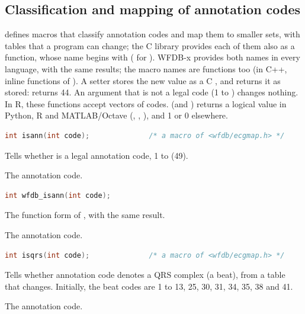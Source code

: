 \subsection{Classification and mapping of annotation codes}
\label{sec:library-ecgmap}

 defines macros that classify annotation codes and map
them to smaller sets, with tables that a program can change; the C library
provides each of them also as a function, whose name begins with
 ( for ). WFDB-x provides both
names in every language, with the same results; the macro names are
functions too (in C++, inline functions of ). A
setter stores the new value as a C , and returns it as stored:
 returns 44. An argument that is not a legal code
(1 to ) changes nothing. In R, these functions accept vectors of
codes.  (and ) returns a logical value in
Python, R and MATLAB/Octave (, , ), and 1 or
0 elsewhere.

\begin{lstlisting}[language=C,style=signature]
int isann(int code);              /* a macro of <wfdb/ecgmap.h> */
\end{lstlisting}
Tells whether  is a legal annotation code, 1 to  (49).
\begin{params}
\item[code] The annotation code.
\end{params}

\begin{lstlisting}[language=C,style=signature]
int wfdb_isann(int code);
\end{lstlisting}
The function form of , with the same result.
\begin{params}
\item[code] The annotation code.
\end{params}

\begin{lstlisting}[language=C,style=signature]
int isqrs(int code);              /* a macro of <wfdb/ecgmap.h> */
\end{lstlisting}
Tells whether annotation code  denotes a QRS complex (a beat), from
a table that  changes. Initially, the beat codes are 1 to 13,
25, 30, 31, 34, 35, 38 and 41.
\begin{params}
\item[code] The annotation code.
\end{params}

